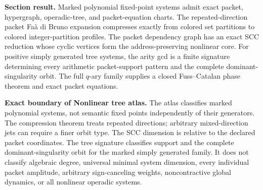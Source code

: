 

\begin{resultbox}
\textbf{Section result.}
Marked polynomial fixed-point systems admit exact packet, hypergraph, operadic-tree, and packet-equation charts.  The repeated-direction packet Fa\`a di Bruno expansion compresses exactly from colored set partitions to colored integer-partition profiles.  The packet dependency graph has an exact SCC reduction whose cyclic vertices form the address-preserving nonlinear core.  For positive simply generated tree systems, the arity gcd is a finite signature determining every arithmetic packet-support pattern and the complete dominant-singularity orbit.  The full $q$-ary family supplies a closed Fuss--Catalan phase theorem and exact packet equations.
\end{resultbox}

\begin{boundarybox}
\textbf{Exact boundary of Nonlinear tree atlas.}
The atlas classifies marked polynomial systems, not semantic fixed points independently of their generators.  The compression theorem treats repeated directions; arbitrary mixed-direction jets can require a finer orbit type.  The SCC dimension is relative to the declared packet coordinates.  The tree signature classifies support and the complete dominant-singularity orbit for the marked simply generated family.  It does not classify algebraic degree, universal minimal system dimension, every individual packet amplitude, arbitrary sign-canceling weights, noncontractive global dynamics, or all nonlinear operadic systems.
\end{boundarybox}
